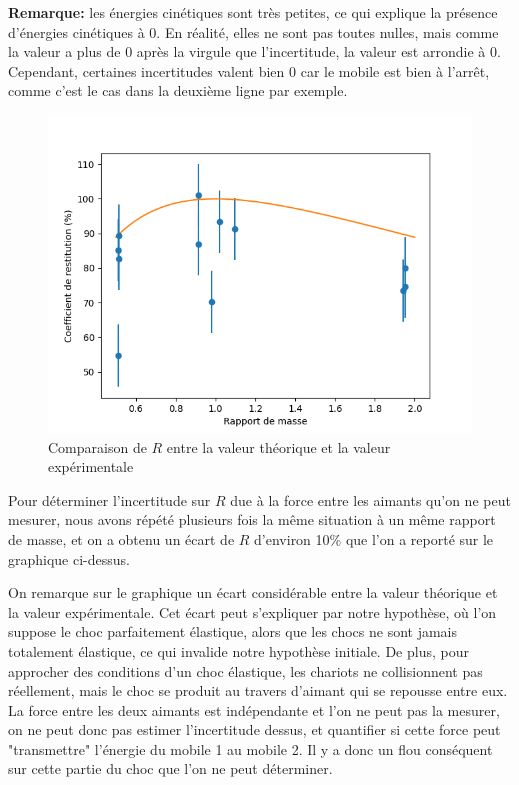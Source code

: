 \documentclass[12pt]{article}
\begin{document}
\textbf{Remarque:} les énergies cinétiques sont très petites, ce qui explique la présence d'énergies cinétiques à $0$. En réalité, elles ne sont pas toutes nulles,
mais comme la valeur a plus de $0$ après la virgule que l'incertitude, la valeur est arrondie à 0. Cependant, certaines incertitudes valent bien 0 car le mobile 
est bien à l'arrêt, comme c'est le cas dans la deuxième ligne par exemple.

\begin{figure}[h!]
    \begin{center}
        \includegraphics[scale=0.8]{RapportMasse.png}
    \end{center}
    \caption{Comparaison de $R$ entre la valeur théorique et la valeur expérimentale}
\end{figure}

Pour déterminer l'incertitude sur $R$ due à la force entre les aimants qu'on ne peut mesurer, nous avons répété plusieurs fois la même situation à un même rapport de masse, 
et on a obtenu un écart de $R$ d'environ 10\% que l'on a reporté sur le graphique ci-dessus.

\newpage
On remarque sur le graphique un écart considérable entre la valeur théorique et la valeur expérimentale. Cet écart peut s'expliquer par notre hypothèse, où l'on suppose le choc parfaitement élastique, alors
que les chocs ne sont jamais totalement élastique, ce qui invalide notre hypothèse initiale. De plus, pour approcher des conditions d'un choc élastique, les chariots ne collisionnent pas réellement, mais le choc se produit
au travers d'aimant qui se repousse entre eux. La force entre les deux aimants est indépendante et l'on ne peut pas la mesurer, on ne peut donc pas estimer l'incertitude dessus, et quantifier si cette force 
peut "transmettre" l'énergie du mobile 1 au mobile 2. Il y a donc un flou conséquent sur cette partie du choc que l'on ne peut déterminer.
\end{document}
